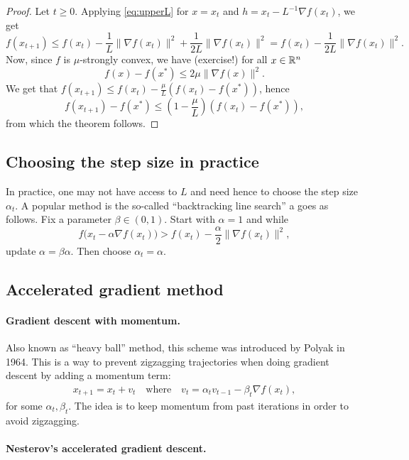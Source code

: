 \documentclass[11pt,nocut]{article}
\begin{document}
\begin{proof}
	Let $t \geq 0$. Applying \eqref{eq:upperL} for $x=x_t$ and $h=x_t - L^{-1} \nabla f(x_t)$, we get
	$$
	f(x_{t+1}) 
	\leq f(x_t) - \frac{1}{L} \|\nabla f(x_t) \|^2 + \frac{1}{2L}\|\nabla f(x_t) \|^2
	= f(x_t) - \frac{1}{2L} \|\nabla f(x_t) \|^2.
	$$
	Now, since $f$ is $\mu$-strongly convex, we have (exercise!) for all $x \in \mathbb{R}^n$
	\begin{equation}\label{eq:boundG}
f(x) - f(x^*) \leq 2 \mu \|\nabla f(x)\|^2.
	\end{equation}
We get that $f(x_{t+1}) \leq f(x_t) - \frac{\mu}{L}(f(x_t) - f(x^*))$, hence
$$
f(x_{t+1}) - f(x^*) \leq (1 - \frac{\mu}{L})(f(x_t) - f(x^*)),
$$
from which the theorem follows.
\end{proof}

\subsection{Choosing the step size in practice}

In practice, one may not have access to $L$ and need hence to choose the step size $\alpha_t$. A popular method is the so-called ``backtracking line search'' a goes as follows.
Fix a parameter $\beta \in (0,1)$.
Start with $\alpha = 1$ and while
$$
f\big(x_t - \alpha \nabla f (x_t) \big) > f(x_t) - \frac{\alpha}{2} \|\nabla f(x_t) \|^2,
$$
update $\alpha =\beta \alpha$. Then choose $\alpha_t = \alpha$.

\subsection{Accelerated gradient method}

\paragraph{Gradient descent with momentum.}

Also known as ``heavy ball'' method, this scheme was introduced by Polyak in 1964.
This is a way to prevent zigzagging trajectories when doing gradient descent by adding a momentum term:
\begin{align*}
	x_{t+1} = x_t + v_t
	\quad \text{where} \quad
	v_t = \alpha_t v_{t-1} - \beta_t \nabla f(x_{t}),
\end{align*}
for some $\alpha_t,\beta_t$. The idea is to keep momentum from past iterations in order to avoid zigzagging.

\paragraph{Nesterov's accelerated gradient descent.}
\end{document}
